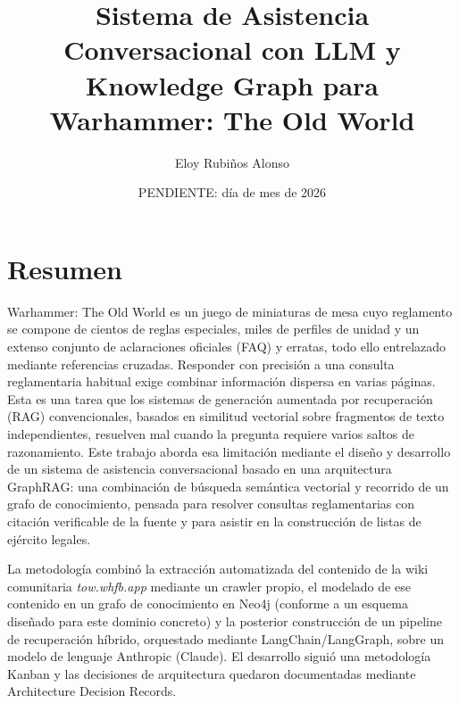 \documentclass[11pt,a4paper,spanish]{book}
\title{Sistema de Asistencia Conversacional con LLM y Knowledge Graph para Warhammer: The Old World}
\author{Eloy Rubiños Alonso}
\date{PENDIENTE: día de mes de 2026} %
\numberwithin{equation}{chapter}
\numberwithin{figure}{chapter}
\numberwithin{table}{chapter}
\begin{document}
\renewcommand{\listfigurename}{Índice de Ilustraciones}
\renewcommand{\listtablename}{Índice de Tablas}
\renewcommand{\contentsname}{Índice de Contenidos}
\renewcommand{\figurename}{Figura}
\renewcommand{\tablename}{Tabla}

\maketitle

\frontmatter
\tableofcontents
\listoffigures
\listoftables

\chapter{Resumen}

Warhammer: The Old World es un juego de miniaturas de mesa cuyo reglamento se compone de cientos de reglas especiales, miles de perfiles de unidad y un extenso conjunto de aclaraciones oficiales (FAQ) y erratas, todo ello entrelazado mediante referencias cruzadas. Responder con precisión a una consulta reglamentaria habitual exige combinar información dispersa en varias páginas. Esta es una tarea que los sistemas de generación aumentada por recuperación (RAG) convencionales, basados en similitud vectorial sobre fragmentos de texto independientes, resuelven mal cuando la pregunta requiere varios saltos de razonamiento. Este trabajo aborda esa limitación mediante el diseño y desarrollo de un sistema de asistencia conversacional basado en una arquitectura GraphRAG: una combinación de búsqueda semántica vectorial y recorrido de un grafo de conocimiento, pensada para resolver consultas reglamentarias con citación verificable de la fuente y para asistir en la construcción de listas de ejército legales.

La metodología combinó la extracción automatizada del contenido de la wiki comunitaria \emph{tow.whfb.app} mediante un crawler propio, el modelado de ese contenido en un grafo de conocimiento en Neo4j (conforme a un esquema diseñado para este dominio concreto) y la posterior construcción de un pipeline de recuperación híbrido, orquestado mediante LangChain/LangGraph, sobre un modelo de lenguaje Anthropic (Claude). El desarrollo siguió una metodología Kanban y las decisiones de arquitectura quedaron documentadas mediante Architecture Decision Records.
\end{document}
